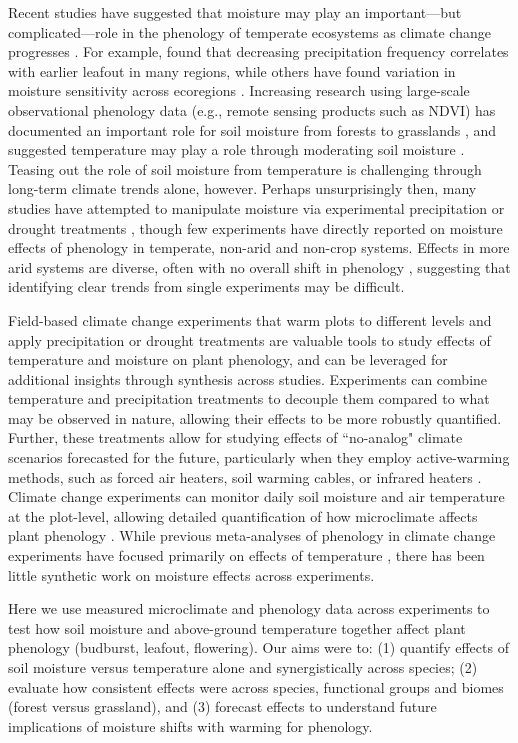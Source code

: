 \documentclass{article}
\begin{document}
\par Recent studies have suggested that moisture may play an important---but complicated---role in the phenology of temperate ecosystems as climate change progresses \citep[e.g.,][]{seyed2018,wang2022}. For example, \citet{wang2022} found that decreasing precipitation frequency correlates with earlier leafout in many regions, while others have found variation in moisture sensitivity across ecoregions \citep{seyed2018}. Increasing research using large-scale observational phenology data (e.g., remote sensing products such as NDVI) has documented an important role for soil moisture from forests to grasslands \citep{lian2020summer,shen2022plant,liu2024soil}, and suggested temperature may play a role through moderating soil moisture \citep{liu2024soil}. Teasing out the role of soil moisture from temperature is challenging through long-term climate trends alone, however. Perhaps unsurprisingly then, many studies have attempted to manipulate moisture via experimental precipitation or drought treatments \citep[e.g.,][]{morin2010,hoeppner2012,rollinson2012b,clark2014a}, though few experiments have directly reported on moisture effects of phenology in temperate, non-arid and non-crop systems. Effects in more arid systems are diverse, often with no overall shift in phenology \citep[e.g.,][]{sherry2007,de2017challenging,howell2020}, suggesting that identifying clear trends from single experiments may be difficult. 

\par Field-based climate change experiments that warm plots to different levels and apply precipitation or drought treatments are valuable tools to study effects of temperature and moisture on plant phenology, and can be leveraged for additional insights through synthesis across studies. Experiments can combine temperature and precipitation treatments to decouple them compared to what may be observed in nature, allowing their effects to be more robustly quantified. Further, these treatments allow for studying effects of ``no-analog" climate scenarios forecasted for the future, particularly when they employ active-warming methods, such as forced air heaters, soil warming cables, or infrared heaters \citep{shaver2000,williams2007b,aronson2009}. Climate change experiments can monitor daily soil moisture and air temperature at the plot-level, allowing detailed quantification of how microclimate affects plant phenology \citep{ettinger2019}. While previous meta-analyses of phenology in climate change experiments have focused primarily on effects of temperature \citep[e.g.,][]{wolkovich2012a}, there has been little synthetic work on moisture effects across experiments. 
\par Here we use measured microclimate and phenology data across experiments to test how soil moisture and above-ground temperature together affect plant phenology (budburst, leafout, flowering). Our aims were to: (1) quantify effects of soil moisture versus temperature alone and synergistically across species; (2) evaluate how consistent effects were across species, functional groups and biomes (forest versus grassland), and (3) forecast effects to understand future implications of moisture shifts with warming for phenology. 
\end{document}
